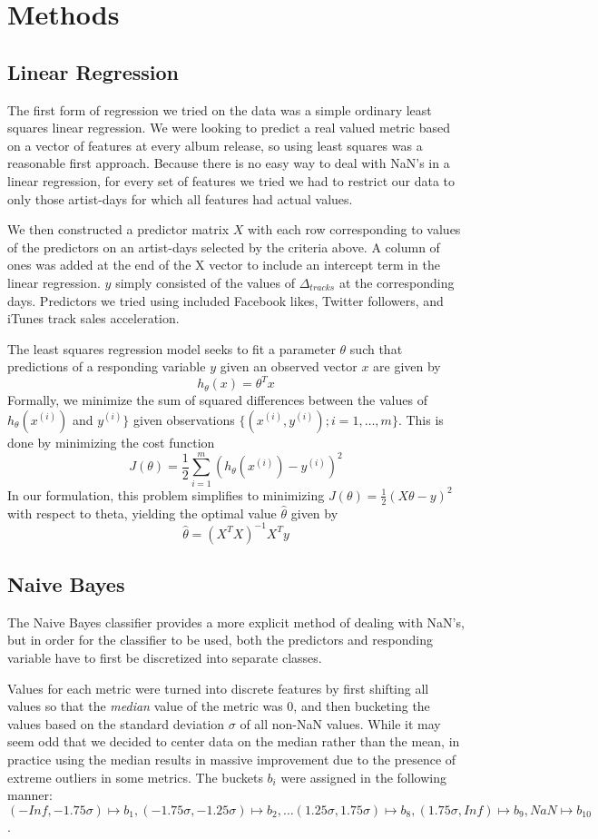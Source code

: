 \documentclass[conference]{IEEEtran}
\begin{document}
\section{Methods}
\subsection{Linear Regression}
The first form of regression we tried on the data was a simple ordinary least squares linear regression. We were looking to predict a real valued metric based on a vector of features at every album release, so using least squares was a reasonable first approach. Because there is no easy way to deal with NaN's in a linear regression, for every set of features we tried we had to restrict our data to only those artist-days for which all features had actual values.

We then constructed a predictor matrix $X$ with each row corresponding to values of the predictors on an artist-days selected by the criteria above. A column of ones was added at the end of the X vector to include an intercept term in the linear regression. $y$ simply consisted of the values of $\Delta_{tracks}$ at the corresponding days. Predictors we tried using included Facebook likes, Twitter followers, and iTunes track sales acceleration.

The least squares regression model seeks to fit a parameter $\theta$ such that predictions of a responding variable $y$ given an observed vector $x$ are given by
$$h_\theta(x) = \theta^T x$$
Formally, we minimize the sum of squared differences between the values of $h_\theta(x^{(i)})$ and $y^{(i)}\}$ given observations $\{(x^{(i)}, y^{(i)}); i = 1,\dots,m\}$. This is done by minimizing the cost function
$$J(\theta) = \frac{1}{2}\sum_{i=1}^{m}(h_\theta(x^{(i)}) - y^{(i)})^2$$
In our formulation, this problem simplifies to minimizing $J(\theta) = \frac{1}{2} (X\theta - y)^2$ with respect to theta, yielding the optimal value $\hat{\theta}$ given by
$$\hat{\theta} = (X^T X)^{-1} X^T y$$

\subsection{Naive Bayes}
The Naive Bayes classifier provides a more explicit method of dealing with NaN's, but in order for the classifier to be used, both the predictors and responding variable have to first be discretized into separate classes.

Values for each metric were turned into discrete features by first shifting all values so that the \textit{median} value of the metric was 0, and then bucketing the values based on the standard deviation $\sigma$ of all non-NaN values. While it may seem odd that we decided to center data on the median rather than the mean, in practice using the median results in massive improvement due to the presence of extreme outliers in some metrics. The buckets $b_i$ were assigned in the following manner: $(-Inf, -1.75\sigma)\mapsto b_1, (-1.75\sigma, -1.25\sigma)\mapsto b_2, \dots (1.25\sigma,1.75\sigma)\mapsto b_8, (1.75\sigma,Inf)\mapsto b_9, NaN\mapsto b_{10}$.
\end{document}
